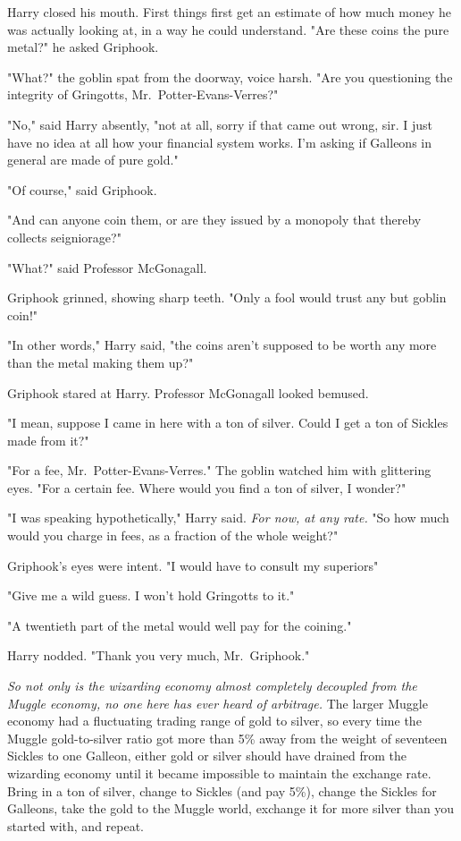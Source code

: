 Harry closed his mouth. First things first{\el} get an estimate
of how much money he was actually looking at, in a way
he could understand. "Are these coins the pure metal?" he asked Griphook.

"What?" the goblin spat from the doorway, voice harsh. "Are you
questioning the integrity of Gringotts, Mr.~Potter-Evans-Verres?"

"No," said Harry absently, "not at all, sorry if that came out wrong, sir. I
just have no idea at all how your financial system works. I'm asking if
Galleons in general are made of pure gold."

"Of course," said Griphook.

"And can anyone coin them, or are they issued by a monopoly that thereby
collects seigniorage?"

"What?" said Professor McGonagall.

Griphook grinned, showing sharp teeth. "Only a fool would trust any but goblin
coin!"

"In other words," Harry said, "the coins aren't supposed to be worth any more
than the metal making them up?"

Griphook stared at Harry. Professor McGonagall looked bemused.

"I mean, suppose I came in here with a ton of silver. Could I get a ton of
Sickles made from it?"

"For a fee, Mr.~Potter-Evans-Verres." The goblin watched him with glittering
eyes. "For a certain fee. Where would you find a ton of silver, I wonder?"

"I was speaking hypothetically," Harry said. \emph{For now, at any rate.}
"So{\el} how much would you charge in fees, as a fraction of the whole
weight?"

Griphook's eyes were intent. "I would have to consult my superiors{\el}"

"Give me a wild guess. I won't hold Gringotts to it."

"A twentieth part of the metal would well pay for the coining."

Harry nodded. "Thank you very much, Mr.~Griphook."

\emph{So not only is the wizarding economy almost completely decoupled from the
Muggle economy, no one here has ever heard of arbitrage.} The larger Muggle
economy had a fluctuating trading range of gold to silver, so every time the
Muggle gold-to-silver ratio got more than 5\% away from the weight of seventeen
Sickles to one Galleon, either gold or silver should have drained from the
wizarding economy until it became impossible to maintain the exchange rate.
Bring in a ton of silver, change to Sickles (and pay 5\%), change the Sickles
for Galleons, take the gold to the Muggle world, exchange it for more silver
than you started with, and repeat.

